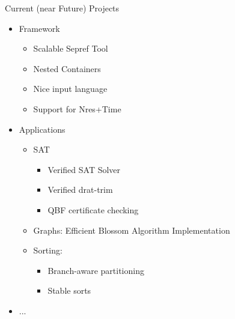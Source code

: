 \documentclass[fleqn]{beamer}
\begin{document}
\begin{frame}{Current (near Future) Projects}
  \begin{itemize}
   \item<+-> Framework
    \begin{itemize}
     \item<+-> Scalable Sepref Tool
     \item<+-> Nested Containers
     \item<+-> Nice input language
     \item<+-> Support for Nres+Time
    \end{itemize}
   \item<+-> Applications
    \begin{itemize}
     \item<+-> SAT
      \begin{itemize}
       \item Verified SAT Solver
       \item Verified drat-trim
       \item QBF certificate checking
      \end{itemize}
     \item<+-> Graphs: Efficient Blossom Algorithm Implementation
     \item<+-> Sorting:
      \begin{itemize}
       \item Branch-aware partitioning
       \item Stable sorts
      \end{itemize}
    \end{itemize}
   \item<+-> ...

  \end{itemize}
\end{frame}
\end{document}

